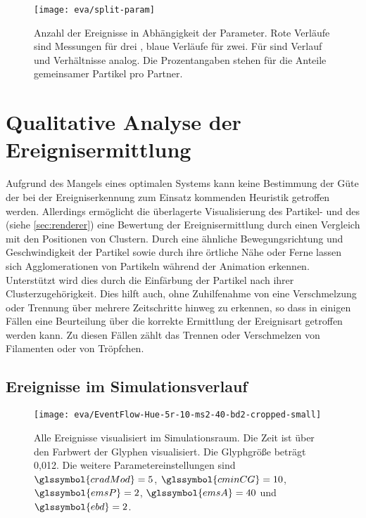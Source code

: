 \begin{figure}
	\texttt{[image: eva/split-param]}
	\caption{Anzahl der Ereignisse in Abhängigkeit der Parameter. Rote Verläufe sind Messungen für drei , blaue Verläufe für zwei. Für  sind Verlauf und Verhältnisse analog. Die Prozentangaben stehen für die Anteile gemeinsamer Partikel pro Partner.}\label{fig:eva:split-param}
\end{figure}

\section{Qualitative Analyse der Ereignisermittlung}\label{sec:eva:ereignisse}

Aufgrund des Mangels eines optimalen Systems kann keine Bestimmung der Güte der bei der Ereigniserkennung zum Einsatz kommenden Heuristik getroffen werden. Allerdings ermöglicht die überlagerte Visualisierung des Partikel- und des  (siehe \autoref{sec:renderer}) eine Bewertung der Ereignisermittlung durch einen Vergleich mit den Positionen von Clustern. Durch eine ähnliche Bewegungsrichtung und Geschwindigkeit der Partikel sowie durch ihre örtliche Nähe oder Ferne lassen sich Agglomerationen von Partikeln während der Animation erkennen. Unterstützt wird dies durch die Einfärbung der Partikel nach ihrer Clusterzugehörigkeit. Dies hilft auch, ohne Zuhilfenahme von  eine Verschmelzung oder Trennung über mehrere Zeitschritte hinweg zu erkennen, so dass in einigen Fällen eine Beurteilung über die korrekte Ermittlung der Ereignisart getroffen werden kann. Zu diesen Fällen zählt das Trennen oder Verschmelzen von Filamenten oder von Tröpfchen.

\subsection*{Ereignisse im Simulationsverlauf}\label{sec:eva:ereignisse-quali-verlauf}

\begin{figure}
	\texttt{[image: eva/EventFlow-Hue-5r-10-ms2-40-bd2-cropped-small]}
	\caption{Alle Ereignisse visualisiert im Simulationsraum. Die Zeit ist über den Farbwert der Glyphen visualisiert. Die Glyphgröße  beträgt 0,012. Die weitere Parametereinstellungen sind $\glssymbol{cradMod} = 5$, $\glssymbol{cminCG} = 10$,  $\glssymbol{emsP} = 2$,  $\glssymbol{emsA} = 40$ und $\glssymbol{ebd} = 2$.}\label{fig:eva:EventFlow-Hue-5r-10-ms2-40-bd2-cropped-small}
\end{figure}

